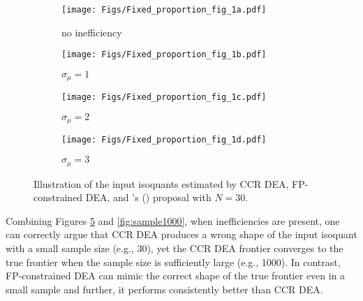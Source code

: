 {\begin{figure}[H]
	\centering
	\begin{subfigure}[b]{0.49\textwidth}
		\centering
		\texttt{[image: Figs/Fixed\_proportion\_fig\_1a.pdf]} 
		\caption[]		{{\small no inefficiency}}    
		\label{fig30:a}
	\end{subfigure}
	\begin{subfigure}[b]{0.49\textwidth}  
		\centering 
		\texttt{[image: Figs/Fixed\_proportion\_fig\_1b.pdf]} 
		\caption[]		{{\small $\sigma_\mu=1$}}    
		\label{fig30:b}
	\end{subfigure}
	\begin{subfigure}[b]{0.49\textwidth}   
		\centering 
		\texttt{[image: Figs/Fixed\_proportion\_fig\_1c.pdf]} 
		\caption[]		{{\small $\sigma_\mu=2$}}    
		\label{fig30:c}
	\end{subfigure}
	\begin{subfigure}[b]{0.49\textwidth}   
		\centering 
		\texttt{[image: Figs/Fixed\_proportion\_fig\_1d.pdf]} 
		\caption[]		{{\small $\sigma_\mu=3$}}    
		\label{fig30:d}
	\end{subfigure}
	\caption[]	{Illustration of the input isoquants estimated by CCR DEA, FP-constrained DEA, and \citeauthor{Barnum2011}'s (\citeyear{Barnum2011}) proposal with $N=30$.}
	\label{fig:sample30}
\end{figure}

Combining Figures \ref{fig:sample30} and \ref{fig:sample1000}, when inefficiencies are present, one can correctly argue that CCR DEA produces a wrong shape of the input isoquant with a small sample size (e.g., 30), yet the CCR DEA frontier converges to the true frontier when the sample size is sufficiently large (e.g., 1000). In contrast, FP-constrained DEA can mimic the correct shape of the true frontier even in a small sample and further, it performs consistently better than CCR DEA.

}
